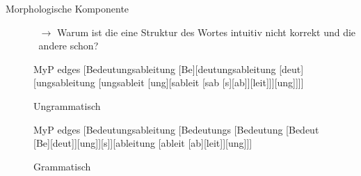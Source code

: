 
\begin{frame}{Morphologische Komponente}

\begin{itemize}
	\item[]
			
	\begin{itemize}
		\item[]
		\item[$\rightarrow$] Warum ist die eine Struktur des Wortes  intuitiv nicht korrekt und die andere schon?
	\end{itemize}
			
\end{itemize}

	
\begin{figure}[b]
	
	\begin{minipage}[b]{0.37\textwidth}
					\tiny{
		\begin{forest}MyP edges
		[Bedeutungsableitung [Be][deutungsableitung [deut][ungsableitung [ungsableit [ung][sableit [sab [s][ab]][leit]]][ung]]]]
		\end{forest}}
		
	\caption{Ungrammatisch}
	\end{minipage}
	\begin{minipage}[b]{0.20\textwidth}
	\end{minipage}
	\begin{minipage}[b]{0.37\textwidth}
	\tiny{
		\begin{forest}MyP edges
		[Bedeutungsableitung [Bedeutungs [Bedeutung [Bedeut [Be][deut]][ung]][s]][ableitung [ableit [ab][leit]][ung]]]
		\end{forest}}
			
	\caption{Grammatisch}
	\end{minipage}
	                        
\end{figure}

\end{frame}


%
%
		
